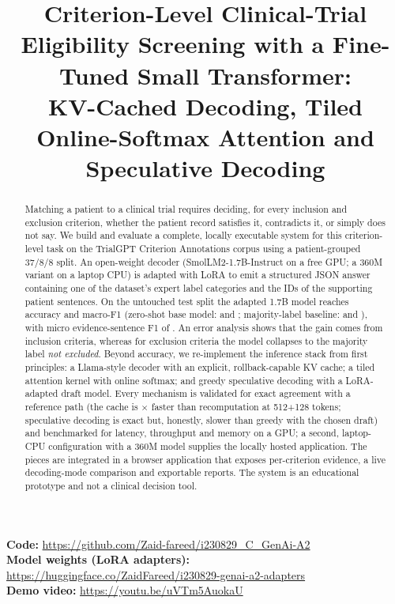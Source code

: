 \documentclass[conference]{IEEEtran}
\begin{document}
\title{Criterion-Level Clinical-Trial Eligibility Screening with a Fine-Tuned Small Transformer:\\
KV-Cached Decoding, Tiled Online-Softmax Attention and Speculative Decoding}

\author{
}

\maketitle

\begin{center}\footnotesize
\textbf{Code:} \url{https://github.com/Zaid-fareed/i230829_C_GenAi-A2}\\
\textbf{Model weights (LoRA adapters):} \url{https://huggingface.co/ZaidFareed/i230829-genai-a2-adapters}\\
\textbf{Demo video:} \url{https://youtu.be/uVTm5AuokaU}
\end{center}

\begin{abstract}
Matching a patient to a clinical trial requires deciding, for every inclusion and exclusion criterion, whether the patient record satisfies it, contradicts it, or simply does not say. We build and evaluate a complete, locally executable system for this criterion-level task on the TrialGPT Criterion Annotations corpus using a patient-grouped 37/8/8 split. An open-weight decoder (SmolLM2-1.7B-Instruct on a free GPU; a 360M variant on a laptop CPU) is adapted with LoRA to emit a structured JSON answer containing one of the dataset's expert label categories and the IDs of the supporting patient sentences. On the untouched test split the adapted 1.7B model reaches \GTestAcc{} accuracy and \GTestMF{} macro-F1 (zero-shot base model: \GBaseAcc{} and \GBaseMF{}; majority-label baseline: \GMajAcc{} and \GMajMF{}), with micro evidence-sentence F1 of \GTestEvF{}. An error analysis shows that the gain comes from inclusion criteria, whereas for exclusion criteria the model collapses to the majority label \emph{not excluded}. Beyond accuracy, we re-implement the inference stack from first principles: a Llama-style decoder with an explicit, rollback-capable KV cache; a tiled attention kernel with online softmax; and greedy speculative decoding with a LoRA-adapted draft model. Every mechanism is validated for exact agreement with a reference path (the cache is \GKVSpeedup$\times$ faster than recomputation at 512+128 tokens; speculative decoding is exact but, honestly, slower than greedy with the chosen draft) and benchmarked for latency, throughput and memory on a GPU; a second, laptop-CPU configuration with a 360M model supplies the locally hosted application. The pieces are integrated in a browser application that exposes per-criterion evidence, a live decoding-mode comparison and exportable reports. The system is an educational prototype and not a clinical decision tool.
\end{abstract}
\end{document}
